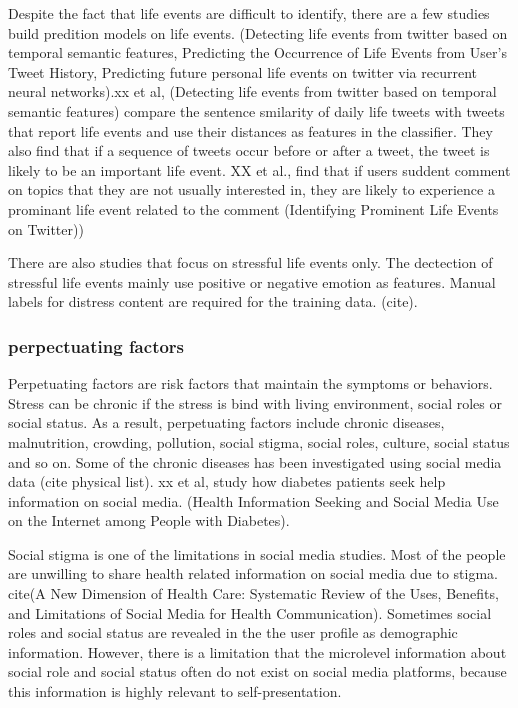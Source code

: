 Despite the fact that life events are difficult to identify, there are a few studies build predition models on life events. (Detecting life events from twitter based on temporal semantic features, Predicting the Occurrence of Life Events from User's Tweet History, Predicting future personal life events on twitter via recurrent neural networks).xx et al, (Detecting life events from twitter based on temporal semantic features) compare the sentence smilarity of daily life tweets with tweets that report life events and use their distances as features in the classifier. They also find that if a sequence of tweets occur before or after a tweet, the tweet is likely to be an important life event. XX et al., find that if users suddent comment on topics that they are not usually interested in, they are likely to experience a prominant life event related to the comment (Identifying Prominent Life Events on Twitter))

There are also studies that focus on stressful life events only. The dectection of stressful life events mainly use positive or negative emotion as features. Manual labels for distress content are required for the training data. (cite). 


\subsubsection{perpectuating factors}

Perpetuating factors are risk factors that maintain the symptoms or behaviors. Stress can be chronic if the stress is bind with living environment, social roles or social status. As a result, perpetuating factors include chronic diseases, malnutrition, crowding, pollution, social stigma, social roles, culture, social status and so on. Some of the chronic diseases has been investigated using social media data (cite physical list). xx et al, study how diabetes patients seek help information on social media. (Health Information Seeking and Social Media Use on the Internet among People with Diabetes).

Social stigma is one of the limitations in social media studies. Most of the people are unwilling to share health related information on social media due to stigma. cite(A New Dimension of Health Care: Systematic Review of the Uses, Benefits, and Limitations of Social Media for Health Communication). Sometimes social roles and social status are revealed in the the user profile as demographic information. However, there is a limitation that the microlevel information about social role and social status often do not exist on social media platforms, because this information is highly relevant to self-presentation.


